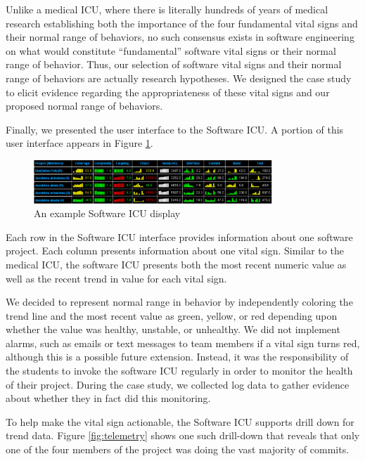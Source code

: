 \documentclass{acm_proc_article-sp}
\begin{document}
Unlike a medical ICU, where there is literally hundreds of years of medical
research establishing both the importance of the four fundamental vital
signs and their normal range of behaviors, no such consensus exists in
software engineering on what would constitute ``fundamental'' software
vital signs or their normal range of behavior.  Thus, our selection of
software vital signs and their normal range of behaviors are actually
research hypotheses.  We designed the case study to elicit evidence
regarding the appropriateness of these vital signs and our proposed normal
range of behaviors.

Finally, we presented the user interface to the Software ICU. A portion of
this user interface appears in Figure \ref{fig:sicu}.

\begin{figure}[ht]
  \center
  \includegraphics[width=0.8\textwidth]{portfolio-2008.eps}
  \caption{An example Software ICU display}
  \label{fig:sicu}
\end{figure} 

Each row in the Software ICU interface provides information about one
software project.  Each column presents information about
one vital sign. Similar to the medical ICU, the software ICU presents both
the most recent numeric value as well as the recent trend in value for each
vital sign.

We decided to represent normal range in behavior by independently
coloring the trend line and the most recent value as green, yellow, or red
depending upon whether the value was healthy, unstable, or
unhealthy.  We did not implement alarms, such as emails or text
messages to team members if a vital sign turns red, although this is a
possible future extension.  Instead, it was the responsibility of the
students to invoke the software ICU regularly in order to monitor the
health of their project.  During the case study, we collected log data to
gather evidence about whether they in fact did this monitoring.

To help make the vital sign actionable, the Software ICU supports drill
down for trend data.  Figure \ref{fig:telemetry} shows one such drill-down
that reveals that only one of the four members of the project was doing the
vast majority of commits.
\end{document}
